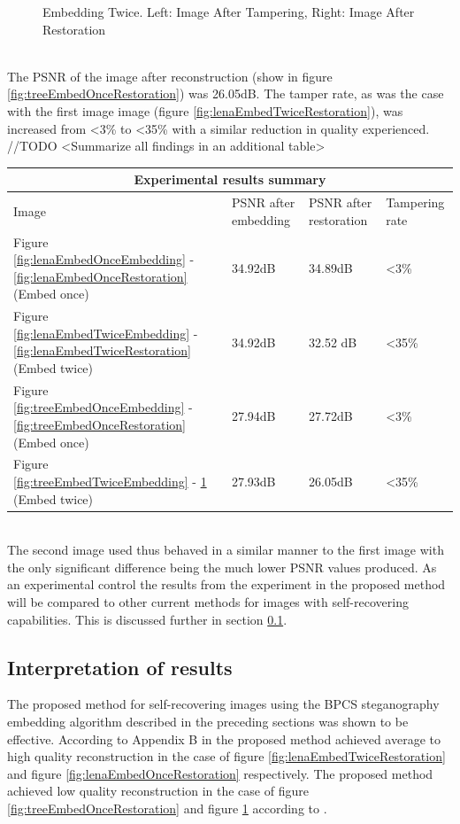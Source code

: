 \documentclass[12pt]{article}
\begin{document}
\begin{figure}[h]
{}%
\caption{Embedding Twice. Left: Image After Tampering, Right: Image After Restoration}
\label{fig:treeEmbedTwiceRestoration}
\end{figure}

\hspace{0pt} \\
The PSNR of the image after reconstruction (show in figure \ref{fig:treeEmbedOnceRestoration}) was 26.05dB.
The tamper rate, as was the case with the first image image (figure \ref{fig:lenaEmbedTwiceRestoration}), was increased from \textless 3\% to \textless 35\% with a similar reduction in quality experienced.
//TODO <Summarize all findings in an additional table>
\begin{center}
  \begin{tabular}{| l | l | l | l |}
    \hline
    \multicolumn{4}{|c|}{Experimental results summary} \\
    \hline
    Image & PSNR after embedding & PSNR after restoration & Tampering rate \\ \hline
    Figure \ref{fig:lenaEmbedOnceEmbedding} - \ref{fig:lenaEmbedOnceRestoration} (Embed once) & 34.92dB & 34.89dB & \textless 3\% \\ \hline
    Figure \ref{fig:lenaEmbedTwiceEmbedding} - \ref{fig:lenaEmbedTwiceRestoration} (Embed twice) & 34.92dB & 32.52 dB & \textless 35\% \\ \hline
    Figure \ref{fig:treeEmbedOnceEmbedding} - \ref{fig:treeEmbedOnceRestoration} (Embed once) & 27.94dB & 27.72dB & \textless 3\% \\ \hline
    Figure \ref{fig:treeEmbedTwiceEmbedding} - \ref{fig:treeEmbedTwiceRestoration} (Embed twice) & 27.93dB & 26.05dB & \textless 35\% \\ \hline
    \hline
  \end{tabular}
\end{center}

\hspace{0pt} \\
The second image used thus behaved in a similar manner to the first image with the only significant difference being the much lower PSNR values produced. As an experimental control the results from the experiment in the proposed method will be compared to other current methods for images with self-recovering capabilities.
This is discussed further in  section \ref{interpretation}.

\subsection{Interpretation of results}
\label{interpretation}
The proposed method for self-recovering images using the BPCS steganography embedding algorithm described in the preceding sections was shown to be effective.
According to Appendix B in \cite{korus2013efficient} the proposed method achieved average to high quality reconstruction in the case of figure \ref{fig:lenaEmbedTwiceRestoration} and figure \ref{fig:lenaEmbedOnceRestoration} respectively.
The proposed method achieved low quality reconstruction in the case of figure \ref{fig:treeEmbedOnceRestoration} and figure \ref{fig:treeEmbedTwiceRestoration} according to \cite{korus2013efficient}.
\end{document}

